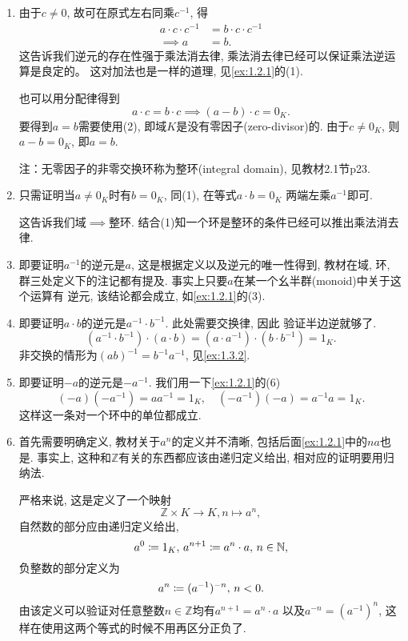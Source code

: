 \begin{solution}
    \begin{enumerate}[(1)]
        \item 由于$c \neq 0$, 故可在原式左右同乘$c^{-1}$, 得 
        \[ 
        \begin{aligned} 
            a \cdot c \cdot c^{-1} &= b \cdot c \cdot c^{-1}\\ 
            \implies a &= b.
        \end{aligned} 
        \]
        这告诉我们逆元的存在性强于乘法消去律, 乘法消去律已经可以保证乘法逆运算是良定的。
        这对加法也是一样的道理, 见\ref{ex:1.2.1}的(1).

        也可以用分配律得到
        \[
            a \cdot c = b \cdot c \implies (a - b) \cdot c = 0_K.
        \]
        要得到$a = b$需要使用(2), 即域$K$是没有零因子(zero-divisor)的. 由于$c \neq 0_K$,
    则$a - b = 0_K$, 即$a = b$.

        注：无零因子的非零交换环称为整环(integral domain), 见教材2.1节p23.
        \item 只需证明当$a \neq 0_K$时有$b = 0_K$, 同(1), 在等式$a \cdot b = 0_K$
    两端左乘$a^{-1}$即可.
        
        这告诉我们域$\implies$整环. 结合(1)知一个环是整环的条件已经可以推出乘法消去律.
        \item 即要证明$a^{-1}$的逆元是$a$, 这是根据定义以及逆元的唯一性得到, 教材在域, 
    环, 群三处定义下的注记都有提及. 事实上只要$a$在某一个幺半群(monoid)中关于这个运算有
    逆元, 该结论都会成立, 如\ref{ex:1.2.1}的(3).
        \item 即要证明$a \cdot b$的逆元是$a^{-1} \cdot b^{-1}$. 此处需要交换律, 因此
    验证半边逆就够了.
    \[
        (a^{-1} \cdot b^{-1}) \cdot (a \cdot b) = (a \cdot a^{-1}) \cdot (b \cdot b^{-1}) = 1_K.
    \]
    非交换的情形为$(ab)^{-1} = b^{-1}a^{-1}$, 见\ref{ex:1.3.2}.
        \item 即要证明$-a$的逆元是$-a^{-1}$. 我们用一下\ref{ex:1.2.1}的(6)
    \[
        (-a)(-a^{-1}) = aa^{-1} = 1_K, \quad (-a^{-1})(-a) = a^{-1}a = 1_K.
    \]
    这样这一条对一个环中的单位都成立.
        \item 首先需要明确定义, 教材关于$a^n$的定义并不清晰, 包括后面\ref{ex:1.2.1}中的$na$也是.
    事实上, 这种和$\mathbb{Z}$有关的东西都应该由递归定义给出, 相对应的证明要用归纳法.
        
        严格来说, 这是定义了一个映射
    \[
        \mathbb{Z} \times K \to K, n \mapsto a^n,
    \]
        自然数的部分应由递归定义给出, 
    \[
        a^0 \mathrel{\coloneqq} 1_K,\, a^{n + 1} \mathrel{\coloneqq} a^n \cdot a,\, n \in \mathbb{N},
    \]
        负整数的部分定义为
    \[
        a^n \mathrel{\coloneqq} (a^{-1})^{-n},\, n < 0. 
    \]
    由该定义可以验证对任意整数$n \in \mathbb{Z}$均有$a^{n + 1} = a^n \cdot a$
    以及$a^{-n} = (a^{-1})^n$, 这样在使用这两个等式的时候不用再区分正负了.


\end{enumerate}
\end{solution}
